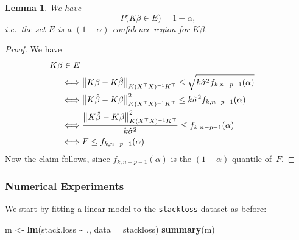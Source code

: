 \documentclass[
  a4paper,
]{article}
\newenvironment{Shaded}{\begin{snugshade}}{\end{snugshade}}
\newcommand{\AttributeTok}[1]{\textcolor[rgb]{0.13,0.29,0.53}{#1}}
\newcommand{\FunctionTok}[1]{\textcolor[rgb]{0.13,0.29,0.53}{\textbf{#1}}}
\newcommand{\NormalTok}[1]{#1}
\newcommand{\OtherTok}[1]{\textcolor[rgb]{0.56,0.35,0.01}{#1}}
\newcommand{\SpecialCharTok}[1]{\textcolor[rgb]{0.81,0.36,0.00}{\textbf{#1}}}
\newtheorem{lemma}{Lemma}[section]
\theoremstyle{definition}
\theoremstyle{definition}
\theoremstyle{definition}
\theoremstyle{definition}
\theoremstyle{remark}
\begin{document}
\begin{lemma}
We have
\begin{equation*}
  P\bigl( K\beta \in E \bigr)
  = 1 - \alpha,
\end{equation*}
\emph{i.e.}~the set \(E\) is a \((1-\alpha)\)-confidence region for \(K\beta\).
\end{lemma}

\begin{proof}
We have
\begin{align*}
  &\hskip-5mm K\beta \in E \\
  &\Longleftrightarrow
      \bigl\| K\beta - K \hat\beta \bigr\|_{K(X^\top X)^{-1} K^\top}
        \leq \sqrt{k \hat\sigma^2 f_{k,n-p-1}(\alpha)} \\
  &\Longleftrightarrow
      \bigl\| K\hat\beta - K\beta \bigr\|_{K(X^\top X)^{-1} K^\top}^2
        \leq k \hat\sigma^2 f_{k,n-p-1}(\alpha) \\
  &\Longleftrightarrow
      \frac{\bigl\| K\hat\beta - K\beta \bigr\|_{K(X^\top X)^{-1} K^\top}^2}
           {k \hat\sigma^2}
        \leq f_{k,n-p-1}(\alpha) \\
  &\Longleftrightarrow
    F \leq f_{k,n-p-1}(\alpha)
\end{align*}
Now the claim follows, since \(f_{k,n-p-1}(\alpha)\) is the
\((1-\alpha)\)-quantile of~\(F\).
\end{proof}

\subsubsection{Numerical Experiments}\label{numerical-experiments}

We start by fitting a linear model to the \texttt{stackloss} dataset as
before:

\begin{Shaded}
\begin{Highlighting}[]
\NormalTok{m }\OtherTok{\textless{}{-}} \FunctionTok{lm}\NormalTok{(stack.loss }\SpecialCharTok{\textasciitilde{}}\NormalTok{ ., }\AttributeTok{data =}\NormalTok{ stackloss)}
\FunctionTok{summary}\NormalTok{(m)}
\end{Highlighting}
\end{Shaded}
\end{document}
